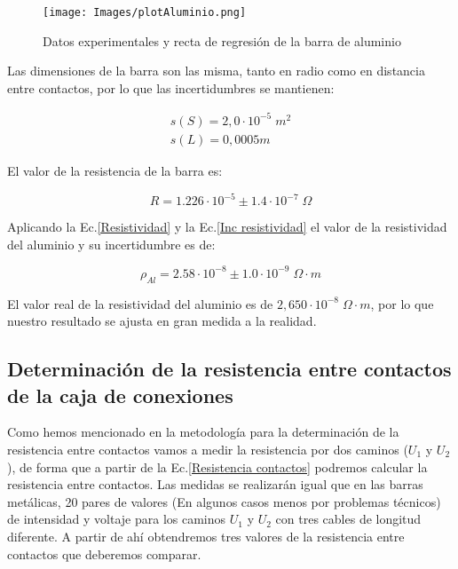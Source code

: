 \documentclass[a4paper,12pt,titlepage]{article}
\begin{document}
\begin{figure}[h!]
    \centering
    \texttt{[image: Images/plotAluminio.png]}
    \caption{Datos experimentales y recta de regresión de la barra de aluminio}
\end{figure}

\newpage

Las dimensiones de la barra son las misma, tanto en radio como en distancia entre contactos, por lo que las incertidumbres se mantienen:

\begin{equation}
    \begin{gathered}
        s(S) = 2,0\cdot 10^{-5} \; m^2 \\
        s(L) = 0,0005m
    \end{gathered}
\end{equation}

El valor de la resistencia de la barra es:

\begin{equation}
    R = 1.226 \cdot 10^{-5} \pm 1.4 \cdot 10^{-7} \; \Omega
\end{equation}

Aplicando la Ec.\ref{Resistividad} y la Ec.\ref{Inc resistividad} el valor de la resistividad del aluminio y su incertidumbre es de:

\begin{equation}
    \rho_{Al} = 2.58 \cdot 10^{-8} \pm
    1.0\cdot 10^{-9} \; \Omega \cdot m
\end{equation}

El valor real de la resistividad del aluminio es de $2,650 \cdot 10^{-8} \; \Omega \cdot m$, por lo que nuestro resultado se ajusta en gran medida a la realidad.

\newpage

\subsection{Determinación de la resistencia entre contactos de la caja de conexiones}

Como hemos mencionado en la metodología para la determinación de la resistencia entre contactos vamos a medir la resistencia por dos caminos ($U_{1}$ y $U_{2}$), de forma que a partir de la Ec.\ref{Resistencia contactos} podremos calcular la resistencia entre contactos. Las medidas se realizarán igual que en las barras metálicas, 20 pares de valores (En algunos casos menos por problemas técnicos) de intensidad y voltaje para los caminos $U_{1}$ y $U_{2}$ con tres cables de longitud diferente. A partir de ahí obtendremos tres valores de la resistencia entre contactos que deberemos comparar.
\end{document}
